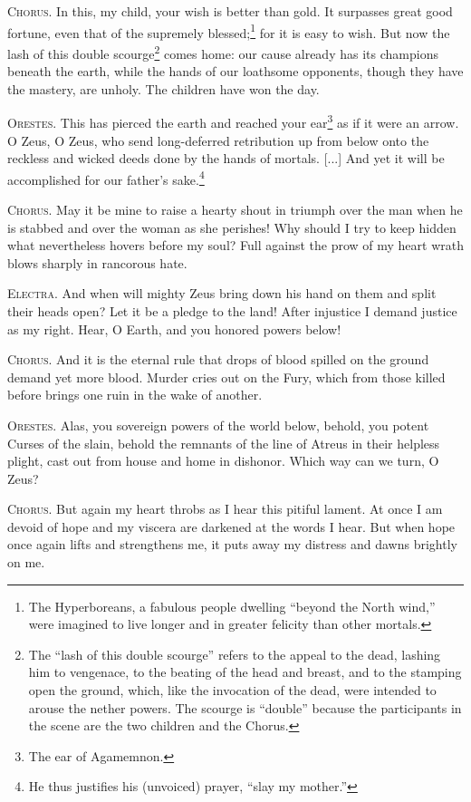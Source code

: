 \documentclass[12pt]{article}
\begin{document}
\textsc{Chorus.} In this, my child, your wish is better than gold. It surpasses great good fortune, even that of the supremely blessed;\footnote{The Hyperboreans, a fabulous people dwelling ``beyond the North wind,'' were imagined to live longer and in greater felicity than other mortals.} for it is easy to wish. But now the lash of this double scourge\footnote{The ``lash of this double scourge'' refers to the appeal to the dead, lashing him to vengenace, to the beating of the head and breast, and to the stamping open the ground, which, like the invocation of the dead, were intended to arouse the nether powers. The scourge is ``double'' because the participants in the scene are the two children and the Chorus.} comes home: our cause already has its champions beneath the earth, while the hands of our loathsome opponents, though they have the mastery, are unholy. The children have won the day.

\textsc{Orestes.} This has pierced the earth and reached your ear\footnote{The ear of Agamemnon.} as if it were an arrow. O Zeus, O Zeus, who send long-deferred retribution up from below onto the reckless and wicked deeds done by the hands of mortals. [...] And yet it will be accomplished for our father's sake.\footnote{He thus justifies his (unvoiced) prayer, ``slay my mother.''}

\textsc{Chorus.} May it be mine to raise a hearty shout in triumph over the man when he is stabbed and over the woman as she perishes! Why should I try to keep hidden what nevertheless hovers before my soul? Full against the prow of my heart wrath blows sharply in rancorous hate.

\textsc{Electra.} And when will mighty Zeus bring down his hand on them and split their heads open? Let it be a pledge to the land! After injustice I demand justice as my right. Hear, O Earth, and you honored powers below!

\textsc{Chorus.} And it is the eternal rule that drops of blood spilled on the ground demand yet more blood. Murder cries out on the Fury, which from those killed before brings one ruin in the wake of another.

\textsc{Orestes.} Alas, you sovereign powers of the world below, behold, you potent Curses of the slain, behold the remnants of the line of Atreus in their helpless plight, cast out from house and home in dishonor. Which way can we turn, O Zeus?

\textsc{Chorus.} But again my heart throbs as I hear this pitiful lament. At once I am devoid of hope and my viscera are darkened at the words I hear. But when hope once again lifts and strengthens me, it puts away my distress and dawns brightly on me.
\end{document}

